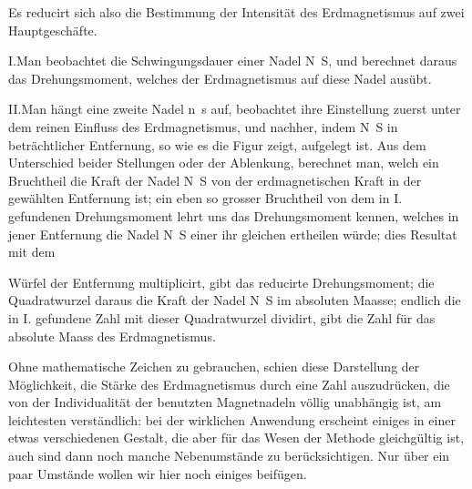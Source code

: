 Es reducirt sich also die Bestimmung der Intensität des Erdmagnetismus auf zwei Hauptgeschäfte.

I.\quad Man beobachtet die Schwingungsdauer einer Nadel N~S, und berechnet daraus das Drehungsmoment, welches der Erdmagnetismus auf diese Nadel ausübt.

II.\quad Man hängt eine zweite Nadel n~s auf, beobachtet ihre Einstellung zuerst unter dem reinen Einfluss des Erdmagnetismus, und nachher, indem N~S in beträchtlicher Entfernung, so wie es die Figur zeigt, aufgelegt ist. Aus dem Unterschied beider Stellungen oder der Ablenkung, berechnet man, welch ein Bruchtheil die Kraft der Nadel N~S von der erdmagnetischen Kraft in der gewählten Entfernung ist; ein eben so grosser Bruchtheil von dem in I. gefundenen Drehungsmoment lehrt uns das Drehungsmoment kennen, welches in jener Entfernung die Nadel N~S einer ihr gleichen ertheilen würde; dies Resultat mit dem
\par\clearpage
{}
\noindent Würfel der Entfernung multiplicirt, gibt das reducirte Drehungsmoment; die Quadratwurzel daraus die Kraft der Nadel N~S im absoluten Maasse; endlich die in I. gefundene Zahl mit dieser Quadratwurzel dividirt, gibt die Zahl für das absolute Maass des Erdmagnetismus.

Ohne mathematische Zeichen zu gebrauchen, schien diese Darstellung der Möglichkeit, die Stärke des Erdmagnetismus durch eine Zahl auszudrücken, die von der Individualität der benutzten Magnetnadeln völlig unabhängig ist, am leichtesten verständlich: bei der wirklichen Anwendung erscheint einiges in einer etwas verschiedenen Gestalt, die aber für das Wesen der Methode gleichgültig ist, auch sind dann noch manche Nebenumstände zu berücksichtigen. Nur über ein paar Umstände wollen wir hier noch einiges beifügen.

